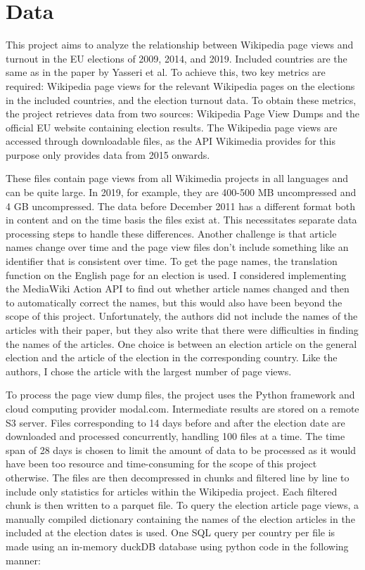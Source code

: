 \chapter{Data}
\label{sec:data}
This project aims to analyze the relationship between Wikipedia page views and turnout in the EU elections of 2009, 2014, and 2019. Included countries are the same as in the paper by Yasseri et al. To achieve this, two key metrics are required: Wikipedia page views for the relevant Wikipedia pages on the elections in the included countries, and the election turnout data. To obtain these metrics, the project retrieves data from two sources: Wikipedia Page View Dumps and the official EU website containing election results. The Wikipedia page views are accessed through downloadable files, as the API Wikimedia provides for this purpose only provides data from 2015 onwards. 

These files contain page views from all Wikimedia projects in all languages and can be quite large. In 2019, for example, they are  400-500 MB uncompressed and 4 GB uncompressed. The data before December 2011 has a different format both in content and on the time basis the files exist at. This necessitates separate data processing steps to handle these differences. Another challenge is that article names change over time and the page view files don't include something like an identifier that is consistent over time. To get the page names, the translation function on the English page for an election is used. I considered implementing the MediaWiki Action API to find out whether article names changed and then to automatically correct the names, but this would also have been beyond the scope of this project. Unfortunately, the authors did not include the names of the articles with their paper, but they also write that there were difficulties in finding the names of the articles. One choice is between an election article on the general election and the article of the election in the corresponding country. Like the authors, I chose the article with the largest number of page views.

To process the page view dump files, the project uses the Python framework and cloud computing provider modal.com. Intermediate results are stored on a remote S3 server.  Files corresponding to 14 days before and after the election date are downloaded and processed concurrently, handling 100 files at a time. The time span of 28 days is chosen to limit the amount of data to be processed as it would have been too resource and time-consuming for the scope of this project otherwise. The files are then decompressed in chunks and filtered line by line to include only statistics for articles within the Wikipedia project. Each filtered chunk is then written to a parquet file. To query the election article page views, a manually compiled dictionary containing the names of the election articles in the included at the election dates is used. One SQL query per country per file is made using an in-memory duckDB database using python code in the following manner:

